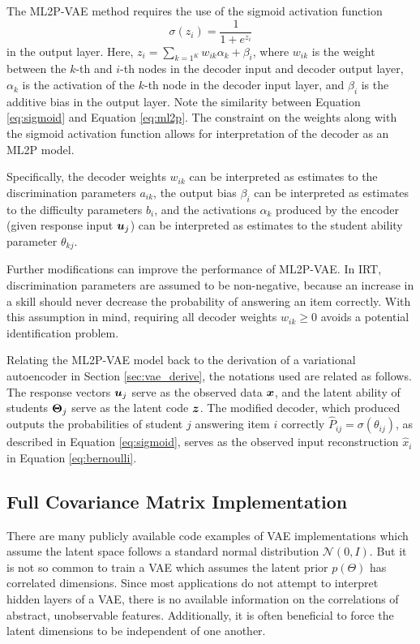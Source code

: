 The ML2P-VAE method requires the use of the sigmoid activation function
\begin{equation}
  \sigma(z_i) = \frac{1}{1 + e^{z_i}}
  \label{eq:sigmoid}
\end{equation}
in the output layer. Here, $z_i = \sum_{k=1^K} w_{ik}\alpha_{k} + \beta_i$, where $w_{ik}$ is the weight between the $k$-th and $i$-th nodes in the decoder input and decoder output layer, $\alpha_k$ is the activation of the $k$-th node in the decoder input layer, and $\beta_i$ is the additive bias in the output layer. Note the similarity between Equation \ref{eq:sigmoid} and Equation \ref{eq:ml2p}. The constraint on the weights along with the sigmoid activation function allows for interpretation of the decoder as an ML2P model.

Specifically, the decoder weights $w_{ik}$ can be interpreted as estimates to the discrimination parameters $a_{ik}$, the output bias $\beta_i$ can be interpreted as estimates to the difficulty parameters $b_i$, and the activations $\alpha_k$ produced by the encoder (given response input $\boldsymbol{u}_j$) can be interpreted as estimates to the student ability parameter $\theta_{kj}$. 

Further modifications can improve the performance of ML2P-VAE. In IRT, discrimination parameters are assumed to be non-negative, because an increase in a skill should never decrease the probability of answering an item correctly. With this assumption in mind, requiring all decoder weights $w_{ik} \geq 0$ avoids a potential identification problem. 

Relating the ML2P-VAE model back to the derivation of a variational autoencoder in Section \ref{sec:vae_derive}, the notations used are related as follows. The response vectors $\boldsymbol{u}_j$ serve as the observed data $\boldsymbol{x}$, and the latent ability of students $\boldsymbol{\Theta}_j$ serve as the latent code $\boldsymbol{z}$. The modified decoder, which produced outputs the probabilities of student $j$ answering item $i$ correctly $\hat P_{ij} = \sigma(\theta_{ij})$, as described in Equation \ref{eq:sigmoid}, serves as the observed input reconstruction $\hat x_i$ in Equation \ref{eq:bernoulli}.

\subsection{Full Covariance Matrix Implementation}\label{sec:cov}
There are many publicly available code examples of VAE implementations which assume the latent space follows a standard normal distribution $\mathcal{N}(0,I)$. But it is not so common to train a VAE which assumes the latent prior $p(\Theta)$ has correlated dimensions. Since most applications do not attempt to interpret hidden layers of a VAE, there is no available information on the correlations of abstract, unobservable features. Additionally, it is often beneficial to force the latent dimensions to be independent of one another.

